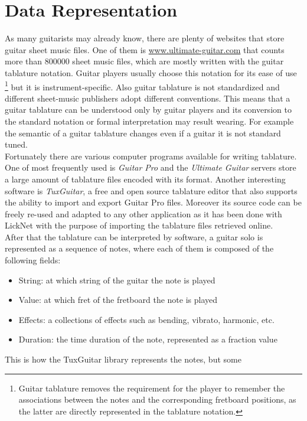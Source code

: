 \documentclass{llncs}
\begin{document}
\section{Data Representation}
As many guitarists may already know, there are plenty of websites that
store guitar sheet music files. One of them is \url{www.ultimate-guitar.com}
that counts more than 800000 sheet music files, which are mostly written
with the guitar tablature notation. Guitar players usually choose this
notation for its ease of use \footnote{Guitar tablature removes the
requirement for the player to remember the associations between the
notes and the corresponding fretboard positions, as the latter are directly
represented in the tablature notation.}
but it is instrument-specific. Also guitar tablature is not standardized and different 
sheet-music publishers adopt different conventions. This means that a
guitar tablature can be understood only by guitar players and its
conversion to the standard notation or formal interpretation may result
wearing. For example the semantic of a guitar tablature changes even if
a guitar it is not standard tuned.\\
Fortunately there are various computer programs available for writing
tablature. One of most frequently used is \emph{Guitar Pro} and the
\emph{Ultimate
Guitar} servers store a large amount of tablature files encoded with its format.
Another interesting software is \emph{TuxGuitar}, a free and open source
tablature editor that also supports the ability to import and export
Guitar Pro files\cite{tuxguitar}. Moreover its source code can be freely
re-used and adapted to any other application as it has been done with
LickNet with the purpose of importing the tablature files retrieved
online.\\
After that the tablature can be interpreted by software, a guitar solo
is represented as a sequence of notes, where each of them is composed
 of the following fields:
\begin{itemize}
	\item String: at which string of the guitar the note is played
	\item Value: at which fret of the fretboard the note is played
	\item Effects: a collections of effects such as bending, vibrato,
		harmonic, etc.
	\item Duration: the time duration of the note, represented as a fraction value
\end{itemize}
This is how the TuxGuitar library represents the notes, but some
\end{document}
